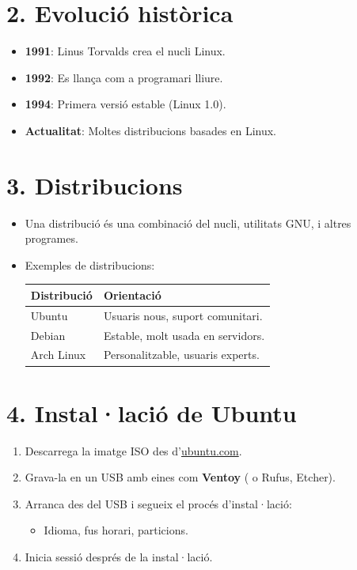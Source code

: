 \documentclass[
  catalan,
  a4paper,
]{article}
\providecommand{\tightlist}{%
  \setlength{\itemsep}{0pt}\setlength{\parskip}{0pt}}
\begin{document}
\section{2. Evolució històrica}\label{evoluciuxf3-histuxf2rica}

\begin{itemize}
\tightlist
\item
  \textbf{1991}: Linus Torvalds crea el nucli Linux.
\item
  \textbf{1992}: Es llança com a programari lliure.
\item
  \textbf{1994}: Primera versió estable (Linux 1.0).
\item
  \textbf{Actualitat}: Moltes distribucions basades en Linux.
\end{itemize}

\section{3. Distribucions}\label{distribucions}

\begin{itemize}
\item
  Una distribució és una combinació del nucli, utilitats GNU, i altres
  programes.
\item
  Exemples de distribucions:

  \begin{longtable}[]{@{}ll@{}}
  \toprule\noalign{}
  \textbf{Distribució} & \textbf{Orientació} \\
  \midrule\noalign{}
  \endhead
  \bottomrule\noalign{}
  \endlastfoot
  Ubuntu & Usuaris nous, suport comunitari. \\
  Debian & Estable, molt usada en servidors. \\
  Arch Linux & Personalitzable, usuaris experts. \\
  \end{longtable}
\end{itemize}

\section{4. Instal·lació de Ubuntu}\label{installaciuxf3-de-ubuntu}

\begin{enumerate}
\def\labelenumi{\arabic{enumi}.}
\tightlist
\item
  Descarrega la imatge ISO des d'\href{https://ubuntu.com/}{ubuntu.com}.
\item
  Grava-la en un USB amb eines com \textbf{Ventoy} ( o Rufus, Etcher).
\item
  Arranca des del USB i segueix el procés d'instal·lació:

  \begin{itemize}
  \tightlist
  \item
    Idioma, fus horari, particions.
  \end{itemize}
\item
  Inicia sessió després de la instal·lació.
\end{enumerate}
\end{document}

